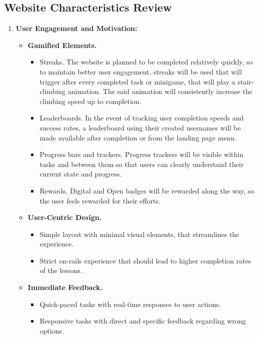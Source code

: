 \subsection{Website Characteristics Review}

\begin{enumerate}
    \item \textbf{User Engagement and Motivation:} 
    \begin{itemize}
        \item \textbf{Gamified Elements.}
        \begin{itemize}
            \item Streaks. The website is planned to be completed relatively quickly, so to maintain better user engagement, streaks will be used that will trigger after every completed task or minigame, that will play a stair-climbing animation. The said animation will consistently increase the climbing speed up to completion.
            \item Leaderboards. In the event of tracking user completion speeds and success rates, a leaderboard using their created usernames will be made available after completion or from the landing page menu.
            \item Progress bars and trackers. Progress trackers will be visible within tasks and between them so that users can clearly understand their current state and progress.
            \item Rewards. Digital and Open badges will be rewarded along the way, so the user feels rewarded for their efforts.
        \end{itemize}
        \item \textbf{User-Centric Design.}
        \begin{itemize}
            \item Simple layout with minimal visual elements, that streamlines the experience.
            \item Strict on-rails experience that should lead to higher completion rates of the lessons.
        \end{itemize}
        \item \textbf{Immediate Feedback.}
        \begin{itemize}
            \item Quick-paced tasks with real-time responses to user actions.
            \item Responsive tasks with direct and specific feedback regarding wrong options.
            \begin{itemize}

\end{itemize}
\end{itemize}
\end{itemize}
\end{enumerate}
